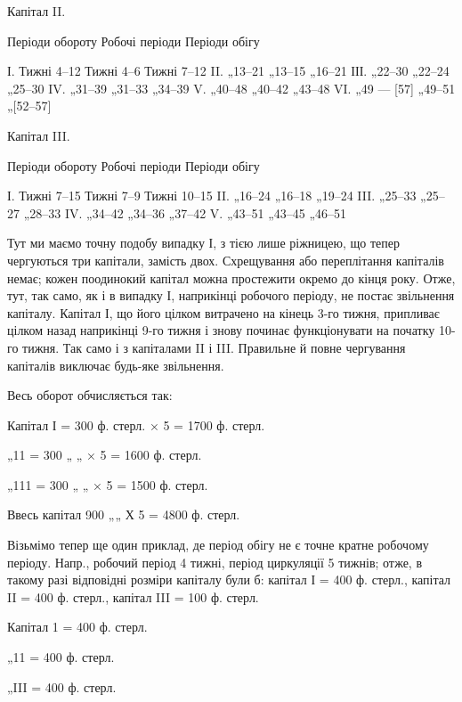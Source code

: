 Капітал II.

Періоди обороту    Робочі періоди    Періоди обігу

І. Тижні    4--12    Тижні 4--6    Тижні 7--12
II. „13--21 „13--15 „16--21
ІІІ. „22--30 „22--24 „25--30
IV. „31--39 „31--33 „34--39
V. „40--48 „40--42 „43--48
VI. „49 — [57] „49--51 „[52--57]

  Капітал III.

Періоди обороту    Робочі періоди    Періоди обігу

І. Тижні    7--15    Тижні 7--9    Тижні 10--15
II. „16--24 „16--18 „19--24
III. „25--33 „25--27 „28--33
IV. „34--42 „34--36 „37--42
V. „43--51 „43--45 „46--51

Тут ми маємо точну подобу випадку І, з тією лише ріжницею, що
тепер чергуються три капітали, замість двох. Схрещування або переплітання
капіталів немає; кожен поодинокий капітал можна простежити
окремо до кінця року. Отже, тут, так само, як і в випадку І, наприкінці
робочого періоду, не постає звільнення капіталу. Капітал І, що його цілком
витрачено на кінець 3-го тижня, припливає цілком назад наприкінці 9-го
тижня і знову починає функціонувати на початку 10-го тижня. Так само і з
капіталами II і III. Правильне й повне чергування капіталів виключає
будь-яке звільнення.

Весь оборот обчисляється так:

Капітал І = 300 ф. стерл. × 5 = 1700 ф. стерл.

„11 = 300 „ „   × 5 = 1600 ф. стерл.

„111 = 300 „ „    × 5 = 1500 ф. стерл.

Ввесь капітал   900 „„    Х 5 = 4800 ф. стерл.

Візьмімо тепер ще один приклад, де період обігу не є точне кратне
робочому періоду. Напр., робочий період 4 тижні, період циркуляції
5 тижнів; отже, в такому разі відповідні розміри капіталу були б:
капітал І = 400 ф. стерл., капітал II = 400 ф. стерл., капітал III = 100 ф. стерл.

Капітал 1 = 400 ф. стерл.

„11 = 400 ф. стерл.

„III = 400 ф. стерл.
